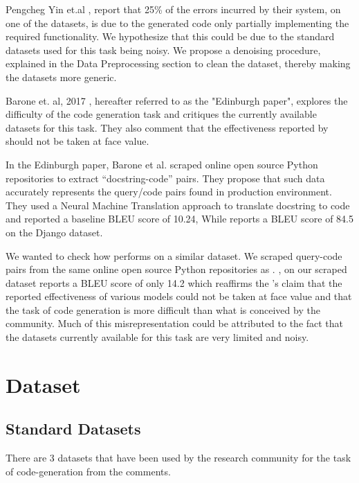 \documentclass{IEEEtran}
\begin{document}
    Pengcheg Yin et.al \cite{yin2017syntactic}, report that 25\% of the errors incurred
    by their system, on one of the datasets, is due to the generated
    code only partially implementing the required functionality.
    We hypothesize that this could be due to the standard datasets
    used for this task being noisy. We propose a denoising procedure,
    explained in the Data Preprocessing section to clean the dataset,
    thereby making the datasets more generic.

    Barone et. al, 2017 \cite{barone2017parallel}, hereafter referred to as the "Edinburgh paper",
    explores the difficulty of the code generation task and critiques
    the currently available datasets for this task. They also comment that
    the effectiveness reported by \cite{yin2017syntactic} should not be taken at face value.

    In the Edinburgh paper, Barone et al. scraped online open source Python
    repositories to extract ``docstring-code'' pairs. They propose that
    such data accurately represents the query/code pairs found in
    production environment. They used a Neural Machine Translation
    approach to translate docstring to code and reported a baseline
    BLEU score of 10.24, While \cite{yin2017syntactic} reports a BLEU score of 84.5 on the
    Django dataset.

    We wanted to check how \cite{yin2017syntactic} performs on a similar dataset.
    We scraped query-code pairs from the same online open source Python repositories as \cite{barone2017parallel}.
    \cite{yin2017syntactic}, on our scraped dataset reports a BLEU score of only 14.2 which reaffirms
    the \cite{barone2017parallel}'s claim that the reported effectiveness of various
    models could not be taken at face value and that the task of code generation
    is more difficult than what is conceived by the community.
    Much of this misrepresentation could be attributed to the fact that the
    datasets currently available for this task are very limited and noisy.

    \section{Dataset}
      \subsection{Standard Datasets}
        There are 3 datasets that have been used by the research community for the task
        of code-generation from the comments.
\end{document}
